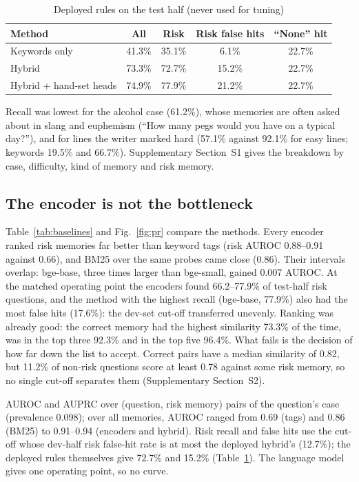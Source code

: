 \documentclass[sn-mathphys-num]{sn-jnl}
\begin{document}
\begin{table}[t]
\caption{Deployed rules on the test half (never used for tuning)}
\label{tab:test}
\footnotesize
\begin{tabular*}{\linewidth}{@{\extracolsep{\fill}}lcccc@{}}
\toprule
Method & All & Risk & Risk false hits & ``None'' hit\\
\midrule
Keywords only & 41.3\% & 35.1\% & 6.1\% & 22.7\%\\
Hybrid & 73.3\% & 72.7\% & 15.2\% & 22.7\%\\
Hybrid + hand-set heads & 74.9\% & 77.9\% & 21.2\% & 22.7\%\\
\bottomrule
\end{tabular*}
\end{table}

Recall was lowest for the alcohol case (61.2\%), whose memories are often asked about in slang and euphemism (``How many pegs would you have on a
typical day?''), and for lines the writer marked hard (57.1\% against 92.1\% for easy lines; keywords 19.5\% and 66.7\%). Supplementary Section~S1
gives the breakdown by case, difficulty, kind of memory and risk memory.

\subsection{The encoder is not the bottleneck}
Table~\ref{tab:baselines} and Fig.~\ref{fig:pr} compare the methods. Every encoder ranked risk memories far better than keyword tags (risk AUROC
0.88--0.91 against 0.66), and BM25 over the same probes came close (0.86). Their intervals overlap: bge-base, three times larger than bge-small,
gained 0.007 AUROC. At the matched operating point the encoders found 66.2--77.9\% of test-half risk questions, and the method with the highest
recall (bge-base, 77.9\%) also had the most false hits (17.6\%): the dev-set cut-off transferred unevenly. Ranking was already good: the correct
memory had the highest similarity 73.3\% of the time, was in the top three 92.3\% and in the top five 96.4\%. What fails is the decision of how
far down the list to accept. Correct pairs have a median similarity of 0.82, but 11.2\% of non-risk questions score at least 0.78 against some risk
memory, so no single cut-off separates them (Supplementary Section~S2).

\begin{table}[t]
\caption{Methods on the test half: threshold-free metrics and an operating point matched on the dev half}
\label{tab:baselines}
\scriptsize

\par\vspace{1mm}\raggedright\scriptsize AUROC and AUPRC over (question, risk memory) pairs of the question's case (prevalence 0.098); over all
memories, AUROC ranged from 0.69 (tags) and 0.86 (BM25) to 0.91--0.94 (encoders and hybrid). Risk recall and false hits use the cut-off whose dev-half risk false-hit rate is at most the deployed hybrid's (12.7\%); the deployed
rules themselves give 72.7\% and 15.2\% (Table~\ref{tab:test}). The language model gives one operating point, so no curve.
\end{table}
\end{document}
